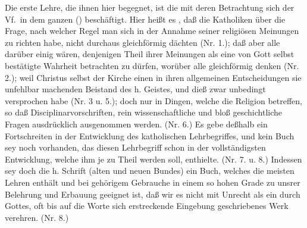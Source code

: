 Die erste Lehre, die ihnen hier begegnet, ist die  mit deren Betrachtung sich der Vf.\ in dem ganzen  () beschäftigt. Hier heißt es , daß die Katholiken über die Frage, nach  welcher Regel man sich in der Annahme seiner religiösen Meinungen zu richten habe, nicht durchaus gleichförmig dächten (Nr. 1.); daß aber alle darüber einig wären, denjenigen Theil ihrer Meinungen als eine von Gott selbst bestätigte Wahrheit betrachten zu dürfen, worüber alle gleichförmig denken (Nr. 2.); weil Christus selbst der Kirche einen in ihren allgemeinen Entscheidungen sie unfehlbar machenden Beistand des h. Geistes, und dieß zwar unbedingt versprochen habe (Nr. 3 u. 5.); doch nur in Dingen, welche die Religion betreffen, so daß Disciplinarvorschriften, rein wissenschaftliche und bloß geschichtliche Fragen ausdrücklich ausgenommen werden. (Nr. 6.) Es gebe deßhalb ein Fortschreiten in der Entwicklung des katholischen Lehrbegriffes, und kein Buch sey noch vorhanden, das diesen Lehrbegriff schon in der vollständigsten Entwicklung, welche ihm je zu Theil werden soll, enthielte. (Nr. 7. u. 8.) Indessen sey doch die h. Schrift (alten und neuen Bundes) ein Buch, welches die meisten Lehren enthält und bei gehörigem Gebrauche in einem so hohen Grade zu unsrer Belehrung und Erbauung geeignet ist, daß wir es nicht mit Unrecht als ein durch Gottes, oft bis auf die Worte sich erstreckende Eingebung geschriebenes Werk verehren. (Nr. 8.) \par
